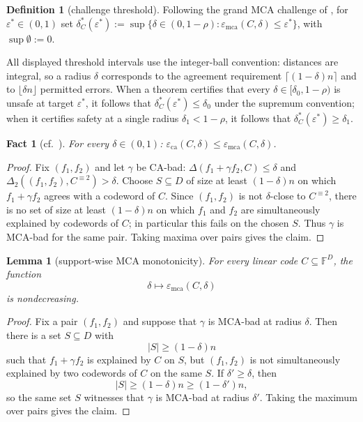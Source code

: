 \documentclass[11pt]{article}
\newtheorem{lemma}[theorem]{Lemma}
\newtheorem{fact}[theorem]{Fact}
\theoremstyle{definition}
\newtheorem{definition}[theorem]{Definition}
\theoremstyle{remark}
\newcommand{\F}{\mathbb{F}}
\newcommand{\eca}{\varepsilon_{\mathrm{ca}}}
\newcommand{\emca}{\varepsilon_{\mathrm{mca}}}
\newcommand{\dist}{\Delta}
\begin{document}
\begin{definition}[challenge threshold]\label{def:dstar}
Following the grand MCA challenge of \cite[\S1]{ABF26}, for $\varepsilon^*\in(0,1)$ set
$\delta^*_C(\varepsilon^*):=\sup\{\delta\in(0,1-\rho):\emca(C,\delta)\le\varepsilon^*\}$, with $\sup\emptyset:=0$.
\end{definition}

All displayed threshold intervals use the integer-ball convention: distances are integral, so a radius $\delta$ corresponds to the agreement requirement $\lceil(1-\delta)n\rceil$ and to $\lfloor\delta n\rfloor$ permitted errors. When a theorem certifies that every $\delta\in[\delta_0,1-\rho)$ is unsafe at target $\varepsilon^*$, it follows that $\delta^*_C(\varepsilon^*)\le\delta_0$ under the supremum convention; when it certifies safety at a single radius $\delta_1<1-\rho$, it follows that $\delta^*_C(\varepsilon^*)\ge\delta_1$.

\begin{fact}[{cf.\ \cite[Fact~4.5]{ABF26}}]\label{fact:chain}
For every $\delta\in(0,1)$: $\eca(C,\delta)\le\emca(C,\delta)$.
\end{fact}

\begin{proof}
Fix $(f_1,f_2)$ and let $\gamma$ be CA-bad: $\dist(f_1+\gamma f_2,C)\le\delta$ and $\dist_2((f_1,f_2),C^{\equiv2})>\delta$. Choose $S\subseteq D$ of size at least $(1-\delta)n$ on which $f_1+\gamma f_2$ agrees with a codeword of $C$. Since $(f_1,f_2)$ is not $\delta$-close to $C^{\equiv2}$, there is no set of size at least $(1-\delta)n$ on which $f_1$ and $f_2$ are simultaneously explained by codewords of $C$; in particular this fails on the chosen $S$. Thus $\gamma$ is MCA-bad for the same pair. Taking maxima over pairs gives the claim.
\end{proof}

\begin{lemma}[support-wise MCA monotonicity]\label{lem:mca-monotone}
For every linear code $C\subseteq\F^D$, the function
\[
        \delta\longmapsto \emca(C,\delta)
\]
is nondecreasing.
\end{lemma}

\begin{proof}
Fix a pair $(f_1,f_2)$ and suppose that $\gamma$ is MCA-bad at radius $\delta$. Then there is a set $S\subseteq D$ with
\[
        |S|\ge (1-\delta)n
\]
such that $f_1+\gamma f_2$ is explained by $C$ on $S$, but $(f_1,f_2)$ is not simultaneously explained by two codewords of $C$ on the same $S$. If $\delta'\ge\delta$, then
\[
        |S|\ge (1-\delta)n\ge (1-\delta')n,
\]
so the same set $S$ witnesses that $\gamma$ is MCA-bad at radius $\delta'$. Taking the maximum over pairs gives the claim.
\end{proof}
\end{document}
